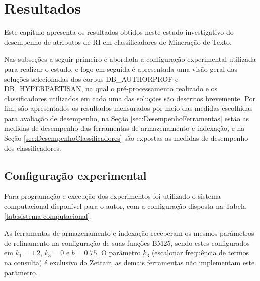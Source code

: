 \chapter{Resultados} \label{ch:Resultados}



	Este capítulo apresenta os resultados obtidos neste estudo investigativo do desempenho de atributos de RI em classificadores de Mineração de Texto.

	Nas subseções a seguir primeiro é abordada a configuração experimental utilizada para realizar o estudo, e logo em seguida é apresentada uma visão geral das soluções selecionadas dos corpus DB\_AUTHORPROF e DB\_HYPERPARTISAN, na qual o pré-processamento realizado e os classificadores utilizados em cada uma das soluções são descritos brevemente.
	Por fim, são apresentados os resultados mensurados por meio das medidas escolhidas para avaliação de desempenho, na Seção \ref{sec:DesempenhoFerramentas} estão as medidas de desempenho das ferramentas de armazenamento e indexação, e na Seção \ref{sec:DesempenhoClassificadores} são expostas as medidas de desempenho dos classificadores.


	\section{Configuração experimental} \label{sec:ConfiguraçãoExperimental}

		Para programação e execução dos experimentos foi utilizado o sistema computacional disponível para o autor, com a configuração disposta na Tabela \ref{tab:sistema-computacional}.

		
		
		As ferramentas de armazenamento e indexação receberam os mesmos parâmetros de refinamento na configuração de suas funções BM25, sendo estes configurados em $k_1 = 1.2$, $k_3 = 0$ e $b = 0.75$.
		O parâmetro $k_3$ (escalonar frequência de termos na consulta) é exclusivo do Zettair, as demais ferramentas não implementam este parâmetro.

